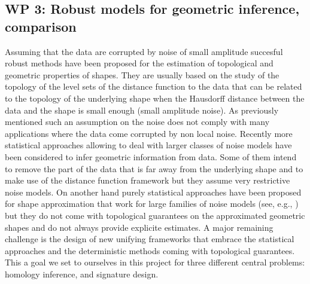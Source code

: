 \subsection*{WP 3:  Robust models for geometric inference, comparison } 


%
%



Assuming that the data are corrupted by noise of small amplitude succesful robust methods have been proposed for the estimation of topological and geometric  properties of shapes. They are usually based on the study of the topology of the level sets of the distance function to the data that can be related to the topology of the underlying shape when the Hausdorff distance  between the data and the shape is small enough (small amplitude noise). As previously mentioned such an assumption on the noise does not comply with many applications where the data come corrupted by non local noise. 
Recently more statistical approaches allowing to deal with larger classes of noise models have been considered to infer geometric information from data. Some of them intend to remove the part of the data that is far away from the underlying shape and to make use of  the distance function framework \cite{nsw-tvu-2011} but they assume very restrictive noise models. On another hand purely statistical approaches have been proposed for shape approximation that work for large families of noise models (see, e.g., \cite{gpvw-mme-2011,gpvw-mesd-2011}) but they do not come with topological guarantees on the approximated geometric shapes and do not always provide explicite estimates. A major remaining challenge is the design of new unifying frameworks that embrace the statistical approaches and the deterministic methods coming with topological guarantees.  
This a goal we set to ourselves in this project for three different central problems: homology inference, and signature design.


